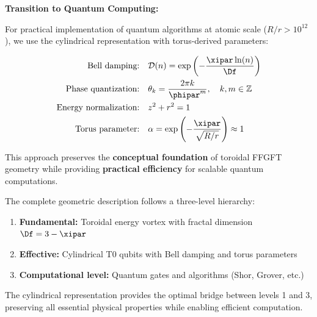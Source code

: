 \textbf{Transition to Quantum Computing:}

For practical implementation of quantum algorithms at atomic scale ($R/r > 10^{12}$), we use the cylindrical representation with torus-derived parameters:

\begin{align}
	\text{Bell damping:} \quad & \mathcal{D}(n) = \exp\left(-\frac{\xipar\ln(n)}{\Df}\right) \\
	\text{Phase quantization:} \quad & \theta_k = \frac{2\pi k}{\phipar^m}, \quad k,m \in \mathbb{Z} \\
	\text{Energy normalization:} \quad & z^2 + r^2 = 1 \\
	\text{Torus parameter:} \quad & \alpha = \exp\left(-\frac{\xipar}{\sqrt{R/r}}\right) \approx 1
\end{align}

This approach preserves the \textbf{conceptual foundation} of toroidal FFGFT geometry while providing \textbf{practical efficiency} for scalable quantum computations.

\begin{remark}
	The complete geometric description follows a three-level hierarchy:
	\begin{enumerate}
		\item \textbf{Fundamental:} Toroidal energy vortex with fractal dimension $\Df=3-\xipar$
		\item \textbf{Effective:} Cylindrical T0 qubits with Bell damping and torus parameters
		\item \textbf{Computational level:} Quantum gates and algorithms (Shor, Grover, etc.)
	\end{enumerate}
	The cylindrical representation provides the optimal bridge between levels 1 and 3, preserving all essential physical properties while enabling efficient computation.
\end{remark}


